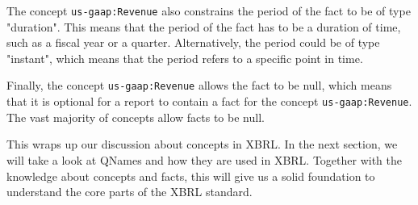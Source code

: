 The concept \texttt{us-gaap:Revenue} also constrains the period of the fact to be of type "duration".
This means that the period of the fact has to be a duration of time, such as a fiscal year or a quarter.
Alternatively, the period could be of type "instant", which means that the period refers to a specific point in time.

Finally, the concept \texttt{us-gaap:Revenue} allows the fact to be null, 
which means that it is optional for a report to contain a fact for the concept \texttt{us-gaap:Revenue}.
The vast majority of concepts allow facts to be null.

This wraps up our discussion about concepts in XBRL.
In the next section, we will take a look at QNames and how they are used in XBRL.
Together with the knowledge about concepts and facts, this will give us a solid foundation to understand the core parts of the XBRL standard.